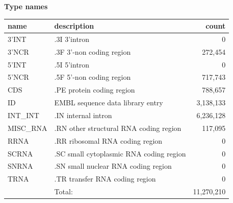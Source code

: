 \documentclass{article}
\begin{document}
\begin{Schunk}
\textbf{Type names}
\noindent\begin{tabular}{llr}
\hline \hline
name & description & count \\
\hline
3'INT  &  .3I 3'intron  &  0 \\
3'NCR  &  .3F  3'-non coding region  &  272,454 \\
5'INT  &  .5I 5'intron  &  0 \\
5'NCR  &  .5F  5'-non coding region  &  717,743 \\
CDS  &  .PE protein coding region  &  788,657 \\
ID  &  EMBL sequence data library entry  &  3,138,133 \\
INT\_INT  &  .IN  internal intron  &  6,236,128 \\
MISC\_RNA  &  .RN other structural RNA coding region  &  117,095 \\
RRNA  &  .RR ribosomal RNA coding region  &  0 \\
SCRNA  &  .SC small cytoplasmic RNA coding region  &  0 \\
SNRNA  &  .SN small nuclear RNA coding region  &  0 \\
TRNA  &  .TR transfer RNA coding region  &  0 \\
\hline
 & Total: & 11,270,210 \\
\hline \hline
\end{tabular}


\end{Schunk}
\end{document}
